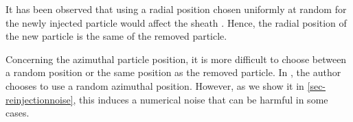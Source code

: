 It has been observed that using a radial position chosen uniformly at random for the newly injected particle would affect the sheath \citep{croes2017a}.
Hence, the radial position of the new particle is the same of the removed particle.

Concerning the azimuthal particle position, it is more difficult to choose between a random position or the same position as the removed particle.
In \citet{lafleur2016a,croes2017a}, the author chooses to use a random azimuthal position.
However, as we show it in \cref{sec-reinjectionnoise}, this induces a numerical noise that can be harmful in some cases.
